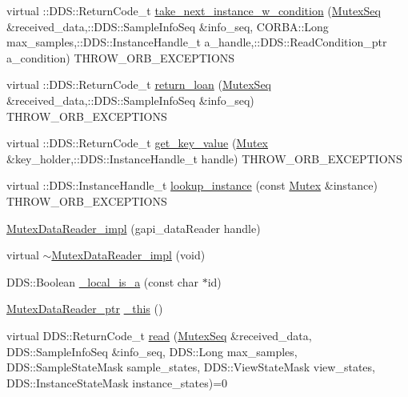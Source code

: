 \begin{DoxyCompactItemize}
\item 
virtual ::DDS::ReturnCode\_\-t \hyperlink{classKnowledge_1_1MutexDataReader__impl_a1888b40028c4c9fe618fe7ca64e0e059}{take\_\-next\_\-instance\_\-w\_\-condition} (\hyperlink{namespaceKnowledge_a3165529aa87299c6a92754fbd7eeeff4}{MutexSeq} \&received\_\-data,::DDS::SampleInfoSeq \&info\_\-seq, CORBA::Long max\_\-samples,::DDS::InstanceHandle\_\-t a\_\-handle,::DDS::ReadCondition\_\-ptr a\_\-condition) THROW\_\-ORB\_\-EXCEPTIONS
\item 
virtual ::DDS::ReturnCode\_\-t \hyperlink{classKnowledge_1_1MutexDataReader__impl_a63d4e5d2944ee684a30e9861e04ba3e0}{return\_\-loan} (\hyperlink{namespaceKnowledge_a3165529aa87299c6a92754fbd7eeeff4}{MutexSeq} \&received\_\-data,::DDS::SampleInfoSeq \&info\_\-seq) THROW\_\-ORB\_\-EXCEPTIONS
\item 
virtual ::DDS::ReturnCode\_\-t \hyperlink{classKnowledge_1_1MutexDataReader__impl_a0cdf12d62791f2a36f2ca5ffd4526579}{get\_\-key\_\-value} (\hyperlink{structKnowledge_1_1Mutex}{Mutex} \&key\_\-holder,::DDS::InstanceHandle\_\-t handle) THROW\_\-ORB\_\-EXCEPTIONS
\item 
virtual ::DDS::InstanceHandle\_\-t \hyperlink{classKnowledge_1_1MutexDataReader__impl_aaa048362e528ea39d9c4ca5409718d50}{lookup\_\-instance} (const \hyperlink{structKnowledge_1_1Mutex}{Mutex} \&instance) THROW\_\-ORB\_\-EXCEPTIONS
\item 
\hyperlink{classKnowledge_1_1MutexDataReader__impl_af6fa024f0910ab269d7d4ba5e1b1f162}{MutexDataReader\_\-impl} (gapi\_\-dataReader handle)
\item 
virtual \hyperlink{classKnowledge_1_1MutexDataReader__impl_a6a76b06874811423f34b4e4359e7d74a}{$\sim$MutexDataReader\_\-impl} (void)
\item 
DDS::Boolean \hyperlink{classKnowledge_1_1MutexDataReader_aaada9486c9827e216a4c270e16dab516}{\_\-local\_\-is\_\-a} (const char $\ast$id)
\item 
\hyperlink{classKnowledge_1_1MutexDataReader}{MutexDataReader\_\-ptr} \hyperlink{classKnowledge_1_1MutexDataReader_a33f387fdc9f878e1ed448d63de1ec4c7}{\_\-this} ()
\item 
virtual DDS::ReturnCode\_\-t \hyperlink{classKnowledge_1_1MutexDataReader_af9d5bf62acb99639c541642065b8da93}{read} (\hyperlink{namespaceKnowledge_a3165529aa87299c6a92754fbd7eeeff4}{MutexSeq} \&received\_\-data, DDS::SampleInfoSeq \&info\_\-seq, DDS::Long max\_\-samples, DDS::SampleStateMask sample\_\-states, DDS::ViewStateMask view\_\-states, DDS::InstanceStateMask instance\_\-states)=0
\item 

\end{DoxyCompactItemize}
